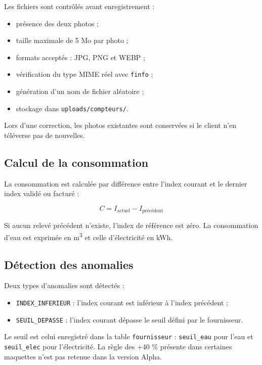 Les fichiers sont contrôlés avant enregistrement :

\begin{itemize}[leftmargin=*]
  \item présence des deux photos ;
  \item taille maximale de 5 Mo par photo ;
  \item formats acceptés : JPG, PNG et WEBP ;
  \item vérification du type MIME réel avec \texttt{finfo} ;
  \item génération d'un nom de fichier aléatoire ;
  \item stockage dans \texttt{uploads/compteurs/}.
\end{itemize}

Lors d'une correction, les photos existantes sont conservées si le client n'en téléverse pas de nouvelles.

\subsection{Calcul de la consommation}

La consommation est calculée par différence entre l'index courant et le dernier index validé ou facturé :

\[
C = I_{\text{actuel}} - I_{\text{précédent}}
\]

Si aucun relevé précédent n'existe, l'index de référence est zéro. La consommation d'eau est exprimée en m\textsuperscript{3} et celle d'électricité en kWh.

\subsection{Détection des anomalies}

Deux types d'anomalies sont détectés :

\begin{itemize}[leftmargin=*]
  \item \texttt{INDEX\_INFERIEUR} : l'index courant est inférieur à l'index précédent ;
  \item \texttt{SEUIL\_DEPASSE} : l'index courant dépasse le seuil défini par le fournisseur.
\end{itemize}

Le seuil est celui enregistré dans la table \texttt{fournisseur} : \texttt{seuil\_eau} pour l'eau et \texttt{seuil\_elec} pour l'électricité. La règle des +40 \% présente dans certaines maquettes n'est pas retenue dans la version Alpha.

